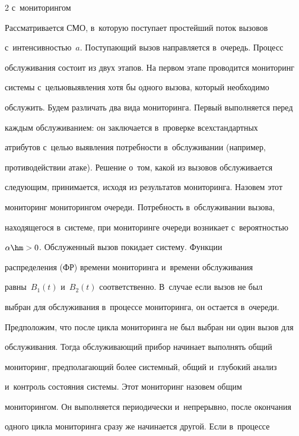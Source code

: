 \begin{multicols}{2}
{с~мониторингом} 


  


  Рассматривается СМО, в~которую поступает простейший поток вызовов 


с~интенсивностью~$a$. Поступающий вызов направляется в~очередь. Процесс 


обслуживания состоит из двух этапов. На первом этапе проводится мониторинг 


системы с~целью\linebreak выявления хотя бы одного вызова, который не\-об\-ходимо 


обслужить. Будем различать два вида мониторинга. Первый выполняется перед 


каж\-дым обслуживанием: он заключается в~проверке всех\linebreak стандартных 


атрибутов с~целью выявления потребности в~обслуживании (например, 


противодействии атаке). Решение о~том, какой из вызовов обслуживается 


следующим, принимается, исходя из результатов мониторинга. Назовем этот 


мониторинг мониторингом очереди. По\-треб\-ность в~обслуживании вызова, 


находящегося в~сис\-те\-ме, при мониторинге очереди возникает с~ве\-ро\-ят\-ностью 


$\alpha\hm >0$. Обслуженный вызов покидает сис\-те\-му. Функции 


распределения (ФР) времени мониторинга и~времени обслуживания 


рав\-ны~$B_1(t)$ и~$B_2(t)$ соответственно. В~случае если вызов не был 


выбран для обслуживания в~процессе мониторинга, он остается в~очереди. 


Предположим, что после цикла мониторинга не был выбран ни один вызов для 


обслуживания. Тогда обслуживающий прибор начинает выполнять общий 


мониторинг, предполагающий более системный, общий и~глубокий анализ 


и~контроль состояния системы. Этот мониторинг назовем общим 


мониторингом. Он выполняется периодически и~непрерывно, после окончания 


одного цикла мониторинга сразу же начинается другой. Если в~процессе 



\end{multicols}
